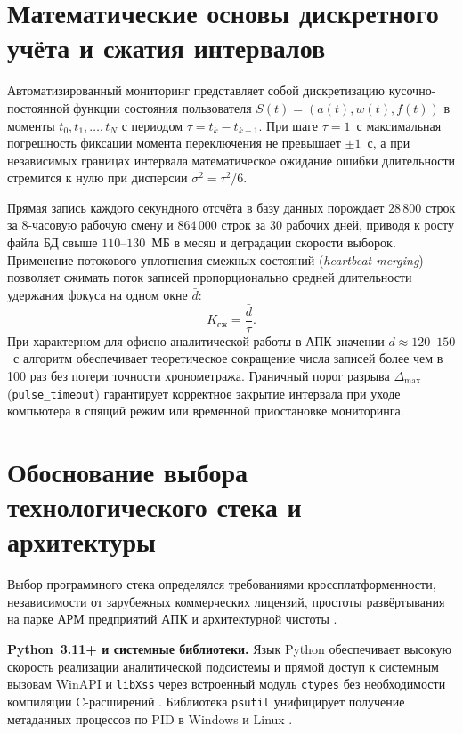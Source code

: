 \documentclass{timcw}
\begin{document}
\section{Математические основы дискретного учёта и сжатия интервалов}

Автоматизированный мониторинг представляет собой дискретизацию кусочно-постоянной функции состояния пользователя $S(t) = (a(t), w(t), f(t))$ в моменты $t_0, t_1, \dots, t_N$ с периодом $\tau = t_k - t_{k-1}$. При шаге $\tau = 1$~с максимальная погрешность фиксации момента переключения не превышает $\pm 1$~с, а при независимых границах интервала математическое ожидание ошибки длительности стремится к нулю при дисперсии $\sigma^2 = \tau^2 / 6$.

Прямая запись каждого секундного отсчёта в базу данных порождает $28\,800$ строк за 8-часовую рабочую смену и $864\,000$ строк за 30 рабочих дней, приводя к росту файла БД свыше $110$--$130$~МБ в месяц и деградации скорости выборок. Применение потокового уплотнения смежных состояний (\emph{heartbeat merging}) \cite{activitywatch} позволяет сжимать поток записей пропорционально средней длительности удержания фокуса на одном окне $\bar{d}$:
\begin{equation}\label{eq:compression_theory}
  K_{\text{сж}} = \frac{\bar{d}}{\tau}.
\end{equation}
При характерном для офисно-аналитической работы в АПК значении $\bar{d} \approx 120$--$150$~с алгоритм обеспечивает теоретическое сокращение числа записей более чем в 100 раз без потери точности хронометража. Граничный порог разрыва $\Delta_{\max}$ (\texttt{pulse\_timeout}) гарантирует корректное закрытие интервала при уходе компьютера в спящий режим или временной приостановке мониторинга.

\section{Обоснование выбора технологического стека и архитектуры}

Выбор программного стека определялся требованиями кроссплатформенности, независимости от зарубежных коммерческих лицензий, простоты развёртывания на парке АРМ предприятий АПК и архитектурной чистоты \cite{martin_clean}.

\textbf{Python~3.11+ и системные библиотеки.} Язык Python обеспечивает высокую скорость реализации аналитической подсистемы и прямой доступ к системным вызовам WinAPI и \texttt{libXss} через встроенный модуль \texttt{ctypes} без необходимости компиляции C-расширений \cite{lutz_python, ramalho_python}. Библиотека \texttt{psutil} унифицирует получение метаданных процессов по PID в Windows и Linux \cite{psutil_docs}.
\end{document}
